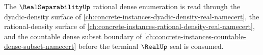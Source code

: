 The $\RealSeparabilityUp$ rational dense enumeration is read through the
dyadic-density surface of
\autoref{ch:concrete-instances-dyadic-density-real-namecert}, the
rational-density surface of
\autoref{ch:concrete-instances-rational-density-real-namecert}, and the
countable dense subset boundary of
\autoref{ch:concrete-instances-countable-dense-subset-namecert} before the
terminal $\RealUp$ seal is consumed.

